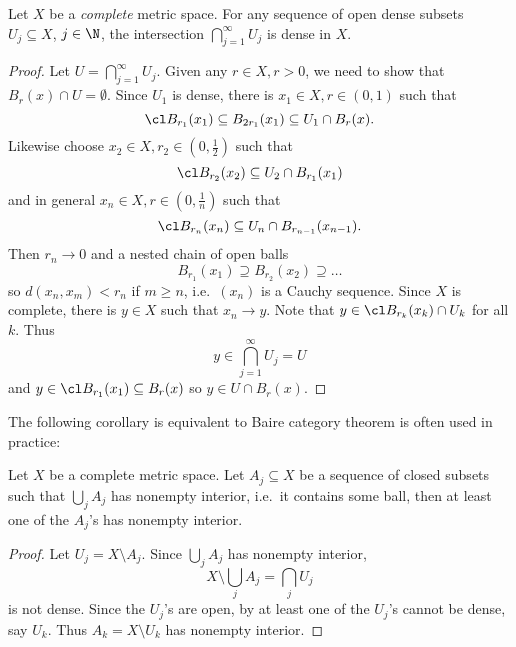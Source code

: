 \documentclass[a4paper]{article}
\begin{document}
\begin{theorem}
  \label{thm:BCT}
  Let \(X\) be a \emph{complete} metric space. For any sequence of open dense subsets \(U_j \subseteq X\), \(j \in \N\), the intersection \(\bigcap_{j = 1}^\infty U_j\) is dense in \(X\).
\end{theorem}

\begin{proof}
  Let \(U = \bigcap_{j = 1}^\infty U_j\). Given any \(r \in X, r > 0\), we need to show that \(B_r(x) \cap U = \emptyset\). Since \(U_1\) is dense, there is \(x_1 \in X, r \in (0, 1)\) such that
  \[
    \cl B_{r_1}(x_1) \subseteq B_{2r_1}(x_1) \subseteq U_1 \cap B_r(x).
  \]
  Likewise choose \(x_2 \in X, r_2 \in (0, \frac{1}{2})\) such that
  \[
    \cl B_{r_2}(x_2) \subseteq U_2 \cap B_{r_1}(x_1)
  \]
  and in general \(x_n \in X, r \in (0, \frac{1}{n})\) such that
  \[
    \cl B_{r_n}(x_n) \subseteq U_n \cap B_{r_{n - 1}}(x_{n - 1}).
  \]
  Then \(r_n \to 0\) and a nested chain of open balls
  \[
    B_{r_1}(x_1) \supseteq B_{r_2}(x_2) \supseteq \dots
  \]
  so \(d(x_n, x_m) < r_n\) if \(m \geq n\), i.e.\ \((x_n)\) is a Cauchy sequence. Since \(X\) is complete, there is \(y \in X\) such that \(x_n \to y\). Note that \(y \in \cl B_{r_k}(x_k) \cap U_k\) for all \(k\). Thus
  \[
    y \in \bigcap_{j = 1}^\infty U_j = U
  \]
  and \(y \in \cl B_{r_1}(x_1) \subseteq B_r(x)\) so \(y \in U \cap B_r(x)\).
\end{proof}

The following corollary is equivalent to Baire category theorem is often used in practice:

\begin{corollary}
  Let \(X\) be a complete metric space. Let \(A_j \subseteq X\) be a sequence of closed subsets such that \(\bigcup_j A_j\) has nonempty interior, i.e.\ it contains some ball, then at least one of the \(A_j\)'s has nonempty interior.
\end{corollary}

\begin{proof}
  Let \(U_j = X \setminus A_j\). Since \(\bigcup_j A_j\) has nonempty interior,
  \[
    X \setminus \bigcup_j A_j = \bigcap_j U_j
  \]
  is not dense. Since the \(U_j\)'s are open, by  at least one of the \(U_j\)'s cannot be dense, say \(U_k\). Thus \(A_k = X \setminus U_k\) has nonempty interior.
\end{proof}
\end{document}
